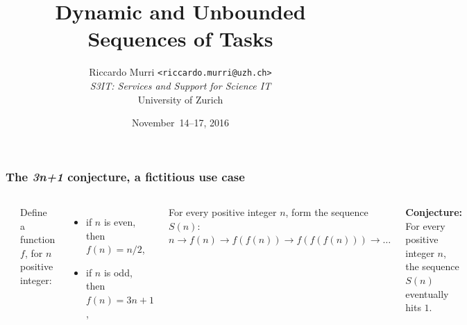 \documentclass[english,serif,mathserif,xcolor=pdftex,dvipsnames,table]{beamer}
\title[Dynamic Sequences]{%
  Dynamic and Unbounded Sequences of Tasks
}
\author[R. Murri, S3IT UZH]{%
  Riccardo Murri \texttt{<riccardo.murri@uzh.ch>}
  \\[1ex]
  \emph{S3IT: Services and Support for Science IT}
  \\[1ex]
  University of Zurich
}
\date{November~14--17, 2016}
\begin{document}
\maketitle


\begin{frame}
  \frametitle{The \emph{3n+1} conjecture, a fictitious use case}
  \label{sec:7a}

  \+
  \begin{columns}[c]
    \includegraphics[height=0.8\textheight]{fig/3n+1}

    Define a function $f$, for $n$ positive integer:
    \begin{itemize}
    \item if $n$ is even, then $f(n) = n / 2$,
    \item if $n$ is odd, then $f(n) = 3n+1$,
    \end{itemize}

    \+
    For every positive integer $n$, form the sequence $S(n)$:
    $n \to f(n) \to f(f(n)) \to f(f(f(n))) \to \ldots$

    \+
    \textbf{Conjecture:} For every positive integer $n$, the sequence $S(n)$
    eventually hits $1$.
  \end{columns}
\end{frame}
\end{document}
